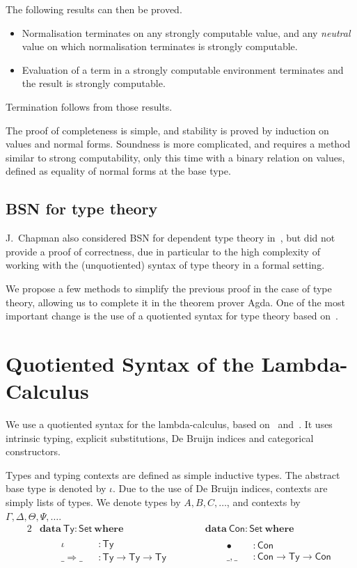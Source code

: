\documentclass[a4paper,english,cleveref,autoref,draft]{lipics-v2019}
\newcommand{\agdaSymb}[1]{\mathsf{#1}}
\newcommand{\agdaKW}[1]{\mathbf{#1}}
\newcommand{\ind}{\hspace{1em}}
\newcommand{\data}{\agdaKW{data}}
\newcommand{\where}{\agdaKW{where}}
\newcommand{\Set}{\agdaSymb{Set}}
\newcommand{\Ty}{\agdaSymb{Ty}}
\newcommand{\Con}{\agdaSymb{Con}}
\newcommand{\Ra}{\Rightarrow}
\begin{document}
The following results can then be proved.
\begin{itemize}
\item Normalisation terminates on any strongly computable value,
  and any \emph{neutral} value on which normalisation terminates
  is strongly computable.
\item Evaluation of a term in a strongly computable environment terminates
  and the result is strongly computable.
\end{itemize}
Termination follows from those results.

The proof of completeness is simple, and stability is proved by induction
on values and normal forms.
Soundness is more complicated, and requires a method similar to strong
computability, only this time with a binary relation on values, defined as
equality of normal forms at the base type.

\subsection{BSN for type theory}
J.~Chapman also considered BSN for dependent type theory
in~\cite{chapman2009type}, but did not provide a proof of correctness,
due in particular to the high complexity of working with the (unquotiented)
syntax of type theory in a formal setting.

We propose a few methods to simplify the previous proof in the case of type
theory, allowing us to complete it in the theorem prover Agda.
One of the most important change is the use of a quotiented syntax for type
theory based on~\cite{kaposi2016type}.


\section{Quotiented Syntax of the Lambda-Calculus}
We use a quotiented syntax for the lambda-calculus, based on~\cite{kaposi2016type}
and~\cite{kaposi2016normalisation}. It uses intrinsic typing, explicit substitutions,
De Bruijn indices and categorical constructors.

Types and typing contexts are defined as simple inductive types.
The abstract base type is denoted by $\iota$.
Due to the use of De Bruijn indices, contexts are simply lists of types.
We denote types by $A,B,C,\dots$, and contexts by $\Gamma,\Delta,\Theta,\Psi,\dots$.
\begin{alignat*}{2}
  & \data\ \Ty : \Set\ \where && \data\ \Con : \Set\ \where \\
  & \ind
  \begin{alignedat}{2}
    & \iota && : \Ty \\
    & \_\Ra\_ && : \Ty \to \Ty \to \Ty \qquad
  \end{alignedat}
  && \ind
  \begin{alignedat}{2}
    & \bullet && : \Con \\
    & \_,\_ && : \Con \to \Ty \to \Con
  \end{alignedat}
\end{alignat*}
\end{document}

